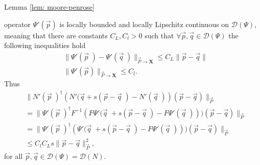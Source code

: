 \begin{myproof}{Lemma \ref{lem: moore-penrose}}
\begin{enumerate}
            operator $\Psi'(\vec{p})$ is locally bounded and locally
            Lipschitz continuous on $\mathcal{D}(\Psi)$, meaning that there are
            constants $C_L, C_l > 0$ such that $\forall \vec{p}, \vec{q} \in
            \mathcal{D}(\Psi)$ the following inequalities hold
            \begin{align}
                &\big\|\Psi'(\vec{p}\;) - \Psi'(\vec{q}\;)
                \big\|_{\vec{P}\to\mathbf{X}} \leq C_L \|\vec{p} - \vec{q} \|
                \\
                &\big\|\Psi'(\vec{p}) \big\|_{\vec{P} \to \mathbf{X}} \le
                C_l.
            \end{align}
            Thus
            \begin{align}
                &\Big\| N'(\vec{p}\;)^{\dagger}\left( N'(\vec{q} + s(\vec{p} -
                \vec{q}\;) - N'(\vec{q}\;)\right)
                (\vec{p} - \vec{q}) \Big\|_{\vec{P}} \\
                &= \Big\|
                \Psi'(\vec{p}\;)^{\dagger}F^{-1}\left( F\Psi'(\vec{q}\;
                + s\left( \vec{p} - \vec{q}\; \right)-F\Psi'(\vec{q}\;)
            \right)) \left(\vec{p} - \vec{q}  \right) \Big\|_{\vec{P}}
            \nonumber \\
                &= \Big\|
                \Psi'(\vec{p}\;)^{\dagger}\left(\Psi'(\vec{q}\;
                + s\left( \vec{p} - \vec{q}\; \right)-F\Psi'(\vec{q}\;)
            \right)) \left(\vec{p} - \vec{q}  \right) \Big\|_{\vec{P}}
            \nonumber\\
                &\leq C_lC_L s \|\vec{p} - \vec{q} \|^{2}_{\vec{P}},
                \nonumber
            \end{align}
        for all $\vec{p}, \vec{q} \in \mathcal{D}(\Psi) = \mathcal{D}(N)$.

    \end{enumerate}

\end{myproof}

